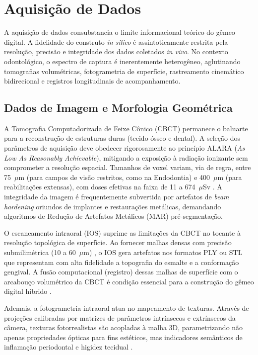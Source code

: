 \section{Aquisição de Dados}
\label{sec:aquisicao}

A aquisição de dados consubstancia o limite informacional teórico do gêmeo digital. A fidelidade do construto \textit{in silico} é assintoticamente restrita pela resolução, precisão e integridade dos dados coletados \textit{in vivo}. No contexto odontológico, o espectro de captura é inerentemente heterogêneo, aglutinando tomografias volumétricas, fotogrametria de superfície, rastreamento cinemático bidirecional e registros longitudinais de acompanhamento.

\subsection{Dados de Imagem e Morfologia Geométrica}
\label{subsec:imagem}

A Tomografia Computadorizada de Feixe Cônico (CBCT) permanece o baluarte para a reconstrução de estruturas duras (tecido ósseo e dental). A seleção dos parâmetros de aquisição deve obedecer rigorosamente ao princípio ALARA (\textit{As Low As Reasonably Achievable}), mitigando a exposição à radiação ionizante sem comprometer a resolução espacial. Tamanhos de voxel variam, via de regra, entre 75~$\mu$m (para campos de visão restritos, como na Endodontia) e 400~$\mu$m (para reabilitações extensas), com doses efetivas na faixa de 11 a 674~$\mu$Sv \cite{ludlow2015dose}. A integridade da imagem é frequentemente subvertida por artefatos de \textit{beam hardening} oriundos de implantes e restaurações metálicas, demandando algoritmos de Redução de Artefatos Metálicos (MAR) pré-segmentação.

O escaneamento intraoral (IOS) suprime as limitações da CBCT no tocante à resolução topológica de superfície. Ao fornecer malhas densas com precisão submilimétrica (10 a 60~$\mu$m) \cite{mangano2023accuracy}, o IOS gera artefatos nos formatos PLY ou STL que representam com alta fidelidade a topografia do esmalte e a conformação gengival. A fusão computacional (registro) dessas malhas de superfície com o arcabouço volumétrico da CBCT é condição essencial para a construção do gêmeo digital híbrido \cite{khoshfekr2025digital}.

Ademais, a fotogrametria intraoral atua no mapeamento de texturas. Através de projeções calibradas por matrizes de parâmetros intrínsecos e extrínsecos da câmera, texturas fotorrealistas são acopladas à malha 3D, parametrizando não apenas propriedades ópticas para fins estéticos, mas indicadores semânticos de inflamação periodontal e higidez tecidual \cite{elsaid2025digital}.

